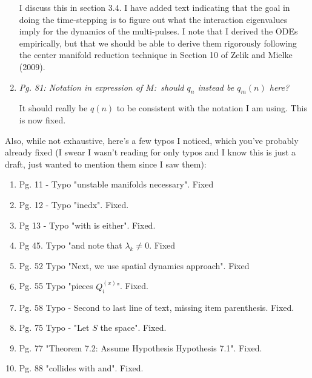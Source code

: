 \documentclass[11pt]{letter}
\begin{document}
\begin{enumerate}
I discuss this in section 3.4. I have added text indicating that the goal in doing the time-stepping is to figure out what the interaction eigenvalues imply for the dynamics of the multi-pulses. I note that I derived the ODEs empirically, but that we should be able to derive them rigorously following the center manifold reduction technique in Section 10 of Zelik and Mielke (2009).

\item \emph{Pg. 81: Notation in expression of $M$: should $q_n$ instead be $q_m(n)$ here?}

It should really be $q(n)$ to be consistent with the notation I am using. This is now fixed.

\end{enumerate}

Also, while not exhaustive, here's a few typos I noticed, which you've probably already fixed (I swear I wasn't reading for only typos and I know this is just a draft, just wanted to mention them since I saw them):

\begin{enumerate}
\item Pg. 11 - Typo "unstable manifolds necessary". Fixed
\item Pg. 12 - Typo "inedx". Fixed.
\item Pg 13 - Typo "with is either". Fixed.
\item Pg 45. Typo "and note that $\lambda_k \neq0$. Fixed
\item Pg. 52 Typo "Next, we use spatial dynamics approach". Fixed
\item Pg. 55 Typo "pieces $Q_i^(x)$". Fixed.
\item Pg. 58 Typo - Second to last line of text, missing item parenthesis. Fixed.
\item Pg. 75 Typo - "Let $S$ the space". Fixed.
\item Pg. 77 "Theorem 7.2: Assume Hypothesis Hypothesis 7.1". Fixed.
\item Pg. 88 "collides with and". Fixed.
\end{enumerate}
\end{document}
